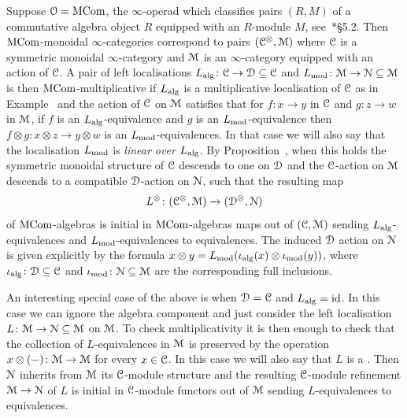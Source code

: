 \begin{example}
\label{example:mcom-loc}%
Suppose $\mathcal{O}=\mathrm{MCom}$, the $\infty$-operad which classifies pairs $(R,M)$ of a commutative algebra object $R$ equipped with an $R$-module $M$, see~\cite{hinich-modules}*{\S 5.2}. Then $\mathrm{MCom}$-monoidal $\infty$-categories correspond to pairs $(\mathcal C^{\otimes},\mathcal{M})$ where $\mathcal C$ is a symmetric monoidal $\infty$-category and $\mathcal{M}$ is an $\infty$-category equipped with an action of $\mathcal C$. A pair of left localisations $L_{\mathrm{alg}}\colon \mathcal C \to \mathcal{D} \subseteq \mathcal C$ and $L_{\mathrm{mod}}\colon \mathcal{M} \to \mathcal{N} \subseteq \mathcal{M}$ is then $\mathrm{MCom}$-multiplicative if $L_{\mathrm{alg}}$ is a multiplicative localisation of $\mathcal C$ as in Example~ and the action of $\mathcal C$ on $\mathcal{M}$ satisfies that for $f\colon x \to y$ in $\mathcal C$ and $g\colon z \to w$ in $\mathcal{M}$, if $f$ is an $L_{\mathrm{alg}}$-equivalence and $g$ is an $L_{\mathrm{mod}}$-equivalence then $f \otimes g \colon x \otimes z \to y \otimes w$ is an $L_{\mathrm{mod}}$-equivalences. In that case we will also say that the localisation $L_{\mathrm{mod}}$ is \emph{linear over $L_{\mathrm{alg}}$}. By Proposition~, when this holds the symmetric monoidal structure of $\mathcal C$ descends to one on $\mathcal{D}$ and the $\mathcal C$-action on $\mathcal{M}$ descends to a compatible $\mathcal{D}$-action on $\mathcal{N}$, such that the resulting map
\[
L^{\otimes}\colon (\mathcal C^{\otimes},\mathcal{M}) \to (\mathcal{D}^{\otimes},\mathcal{N})
\]
of $\mathrm{MCom}$-algebras is initial in $\mathrm{MCom}$-algebras maps out of $(\mathcal C,\mathcal{M})$ sending $L_{\mathrm{alg}}$-equivalences and $L_{\mathrm{mod}}$-equivalences to equivalences. The induced $\mathcal{D}$ action on $\mathcal{N}$ is given explicitly by the formula $x \otimes y = L_{\mathrm{mod}}(\iota_{\mathrm{alg}}(x) \otimes \iota_{\mathrm{mod}}(y))$, where $\iota_{\mathrm{alg}}\colon \mathcal{D} \subseteq \mathcal C$ and $\iota_{\mathrm{mod}}\colon \mathcal{N} \subseteq \mathcal{M}$ are the corresponding full inclusions.

An interesting special case of the above is when $\mathcal{D}=\mathcal C$ and $L_{\mathrm{alg}} = \mathrm{id}$.
In this case we can ignore the algebra component and just consider the left localisation $L\colon \mathcal{M} \to \mathcal{N} \subseteq \mathcal{M}$ on $\mathcal{M}$. To check multiplicativity it is then enough to check that the collection of $L$-equivalences in $\mathcal{M}$ is preserved by the operation $x \otimes (-)\colon \mathcal{M} \to \mathcal{M}$ for every $x \in \mathcal C$. In this case we will also say that $L$ is a . Then $\mathcal{N}$ inherits from $\mathcal{M}$ its $\mathcal C$-module structure and the resulting $\mathcal C$-module refinement $\mathcal{M} \to \mathcal{N}$ of $L$ is initial in $\mathcal C$-module functors out of $\mathcal{M}$ sending $L$-equivalences to equivalences.
\end{example}




